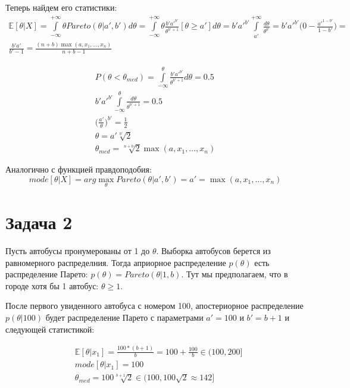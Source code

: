 \documentclass[12pt, a4paper]{article}
\begin{document}
    Теперь найдем его статистики:
    \begin{gather*}
        \mathbb{E}[\theta|X] = \int\limits_{-\infty}^{+\infty}\theta Pareto(\theta|a',b') d\theta =
        \int\limits_{-\infty}^{+\infty}\theta \frac{b'a'^{b'}}{\theta^{b'+1}}[\theta \geq a']d\theta =
        b'a'^{b'} \int\limits_{a'}^{+\infty} \frac{d\theta}{\theta^{b'}} =
        b'a'^{b'} \big(0 - \frac{a'^{1-b'}}{1-b'}\big) = \\
        \frac{b'a'}{b'-1} = \frac{(n+b)\max(a, x_1, \dots, x_n)}{n+b-1}
    \end{gather*}

    \begin{gather*}
        P(\theta < \theta_{med}) = \int\limits_{-\infty}^{\theta}\frac{b'a'^{b'}}{\theta^{b'+1}}d\theta = 0.5\\
        b'a'^{b'} \int\limits_{-\infty}^{\theta} \frac{d\theta}{\theta^{b'+1}} = 0.5\\
        \Big(\frac{a'}{\theta}\Big)^{b'} = \frac{1}{2}\\
        \theta = a'\sqrt[b']{2}\\
        \theta_{med} = \sqrt[n+b]{2} \max(a, x_1, \dots, x_n)
    \end{gather*}

    Аналогично с функцией правдоподобия:
    $$mode[\theta|X] = arg\max_\theta Pareto(\theta|a',b') = a' = \max(a, x_1, \dots, x_n)$$

    \section{Задача 2}

    Пусть автобусы пронумерованы от 1 до $\theta$. Выборка автобусов берется из равномерного распределния. Тогда априорное распределение $p(\theta)$ есть распределение Парето: $p(\theta) = Pareto(\theta|1, b)$. Тут мы предполагаем, что в городе хотя бы 1 автобус: $\theta \geq 1$.

    После первого увиденного автобуса с номером 100, апостериорное распределение $p(\theta|100)$ будет распределение Парето с параметрами $a' = 100$ и $b' = b + 1$ и следующей статистикой:

    \begin{align*}
        &\mathbb{E}[\theta|x_1] = \frac{100 * (b + 1)}{b} = 100 + \frac{100}{b} \in (100, 200]\\
        &mode[\theta|x_1] = 100\\
        &\theta_{med} = 100\sqrt[b+1]{2} \in (100, 100\sqrt{2} \approx 142]
    \end{align*}
\end{document}

